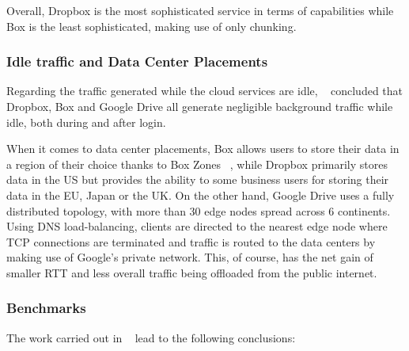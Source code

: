 Overall, Dropbox is the most sophisticated service in terms of capabilities while Box is the least sophisticated, making use of only chunking.

\subsubsection{Idle traffic and Data Center Placements}
Regarding the traffic generated while the cloud services are idle, ~\cite{personal1} concluded that Dropbox, Box and Google Drive all generate negligible background traffic while idle, both during and after login. 

When it comes to data center placements, Box allows users to store their data in a region of their choice thanks to Box Zones ~\cite{box}, while Dropbox primarily stores data in the US but provides the ability to some business users for storing their data in the EU, Japan or the UK.  On the other hand, Google Drive uses a fully distributed topology, with more than 30 edge nodes spread across 6 continents. Using DNS load-balancing, clients are directed to the nearest edge node where TCP connections are terminated and traffic is routed to the data centers by making use of Google's private network. This, of course, has the net gain of smaller RTT and less overall traffic being offloaded from the public internet.

\subsubsection{Benchmarks}

The work carried out in ~\cite{personal1} lead to the following conclusions:

